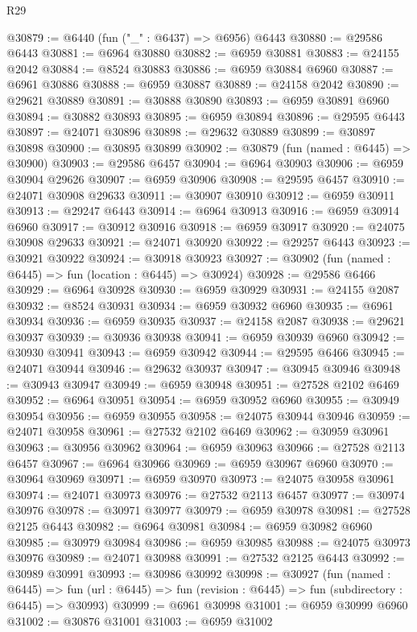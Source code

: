 \begin{lexlean}{R29}
\begin{coremodule}
@30879 := @6440 (fun ("_" : @6437) => @6956) @6443
@30880 := @29586 @6443
@30881 := @6964 @30880
@30882 := @6959 @30881
@30883 := @24155 @2042
@30884 := @8524 @30883
@30886 := @6959 @30884 @6960
@30887 := @6961 @30886
@30888 := @6959 @30887
@30889 := @24158 @2042
@30890 := @29621 @30889
@30891 := @30888 @30890
@30893 := @6959 @30891 @6960
@30894 := @30882 @30893
@30895 := @6959 @30894
@30896 := @29595 @6443
@30897 := @24071 @30896
@30898 := @29632 @30889
@30899 := @30897 @30898
@30900 := @30895 @30899
@30902 := @30879 (fun (named : @6445) => @30900)
@30903 := @29586 @6457
@30904 := @6964 @30903
@30906 := @6959 @30904 @29626
@30907 := @6959 @30906
@30908 := @29595 @6457
@30910 := @24071 @30908 @29633
@30911 := @30907 @30910
@30912 := @6959 @30911
@30913 := @29247 @6443
@30914 := @6964 @30913
@30916 := @6959 @30914 @6960
@30917 := @30912 @30916
@30918 := @6959 @30917
@30920 := @24075 @30908 @29633
@30921 := @24071 @30920
@30922 := @29257 @6443
@30923 := @30921 @30922
@30924 := @30918 @30923
@30927 := @30902 (fun (named : @6445) => fun (location : @6445) => @30924)
@30928 := @29586 @6466
@30929 := @6964 @30928
@30930 := @6959 @30929
@30931 := @24155 @2087
@30932 := @8524 @30931
@30934 := @6959 @30932 @6960
@30935 := @6961 @30934
@30936 := @6959 @30935
@30937 := @24158 @2087
@30938 := @29621 @30937
@30939 := @30936 @30938
@30941 := @6959 @30939 @6960
@30942 := @30930 @30941
@30943 := @6959 @30942
@30944 := @29595 @6466
@30945 := @24071 @30944
@30946 := @29632 @30937
@30947 := @30945 @30946
@30948 := @30943 @30947
@30949 := @6959 @30948
@30951 := @27528 @2102 @6469
@30952 := @6964 @30951
@30954 := @6959 @30952 @6960
@30955 := @30949 @30954
@30956 := @6959 @30955
@30958 := @24075 @30944 @30946
@30959 := @24071 @30958
@30961 := @27532 @2102 @6469
@30962 := @30959 @30961
@30963 := @30956 @30962
@30964 := @6959 @30963
@30966 := @27528 @2113 @6457
@30967 := @6964 @30966
@30969 := @6959 @30967 @6960
@30970 := @30964 @30969
@30971 := @6959 @30970
@30973 := @24075 @30958 @30961
@30974 := @24071 @30973
@30976 := @27532 @2113 @6457
@30977 := @30974 @30976
@30978 := @30971 @30977
@30979 := @6959 @30978
@30981 := @27528 @2125 @6443
@30982 := @6964 @30981
@30984 := @6959 @30982 @6960
@30985 := @30979 @30984
@30986 := @6959 @30985
@30988 := @24075 @30973 @30976
@30989 := @24071 @30988
@30991 := @27532 @2125 @6443
@30992 := @30989 @30991
@30993 := @30986 @30992
@30998 := @30927
    (fun (named : @6445) =>
    fun (url : @6445) => fun (revision : @6445) => fun (subdirectory : @6445) => @30993)
@30999 := @6961 @30998
@31001 := @6959 @30999 @6960
@31002 := @30876 @31001
@31003 := @6959 @31002

\end{coremodule}
\end{lexlean}
